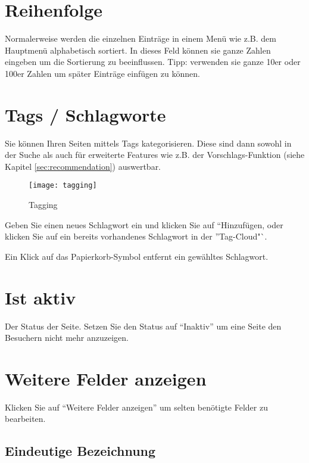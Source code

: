 \documentclass[article, a4paper, oneside, 11pt]{memoir}
\begin{document}
\section{Reihenfolge}

Normalerweise werden die einzelnen Einträge in einem Menü wie z.B. dem Hauptmenü alphabetisch sortiert. In dieses Feld können sie ganze Zahlen eingeben um die Sortierung zu beeinflussen. Tipp: verwenden sie ganze 10er oder 100er Zahlen um später Einträge einfügen zu können. 

\section{Tags / Schlagworte}
\label{sec:tagging}

Sie können Ihren Seiten mittels Tags kategorisieren. Diese sind dann sowohl in der Suche als auch für erweiterte Features wie z.B. der Vorschlags-Funktion (siehe Kapitel \vref{sec:recommendation}) auswertbar.

\begin{figure}[htp]
\centering
\texttt{[image: tagging]}
\caption{Tagging}
\label{fig:tagging}
\end{figure}

Geben Sie einen neues Schlagwort ein und klicken Sie auf "`Hinzufügen, oder klicken Sie auf ein bereits vorhandenes Schlagwort in der "'Tag-Cloud"`.

Ein Klick auf das Papierkorb-Symbol entfernt ein gewähltes Schlagwort.

\section{Ist aktiv}

Der Status der Seite. Setzen Sie den Status auf "`Inaktiv"' um eine Seite den Besuchern nicht mehr anzuzeigen.




\section{Weitere Felder anzeigen}

Klicken Sie auf "`Weitere Felder anzeigen"' um selten benötigte Felder zu bearbeiten.

\subsection{Eindeutige Bezeichnung}
\end{document}
